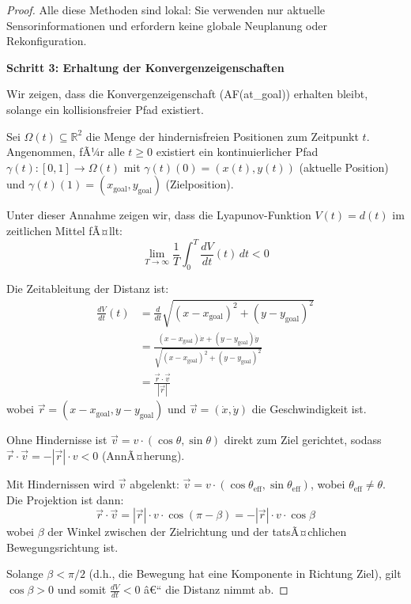 ﻿\documentclass[a4paper,12pt]{article}
\theoremstyle{definition}
\begin{document}
\begin{proof}
Alle diese Methoden sind lokal: Sie verwenden nur aktuelle Sensorinformationen und erfordern keine globale Neuplanung oder Rekonfiguration.

\textbf{Schritt 3: Erhaltung der Konvergenzeigenschaften}

Wir zeigen, dass die Konvergenzeigenschaft (AF(at\_goal)) erhalten bleibt, solange ein kollisionsfreier Pfad existiert.

Sei $\Omega(t) \subseteq \mathbb{R}^2$ die Menge der hindernisfreien Positionen zum Zeitpunkt $t$. Angenommen, fÃ¼r alle $t \geq 0$ existiert ein kontinuierlicher Pfad $\gamma(t): [0,1] \to \Omega(t)$ mit $\gamma(t)(0) = (x(t), y(t))$ (aktuelle Position) und $\gamma(t)(1) = (x_{\text{goal}}, y_{\text{goal}})$ (Zielposition).

Unter dieser Annahme zeigen wir, dass die Lyapunov-Funktion $V(t) = d(t)$ im zeitlichen Mittel fÃ¤llt:
\begin{equation}
\lim_{T \to \infty} \frac{1}{T} \int_0^T \frac{dV}{dt}(t) \, dt < 0
\end{equation}

Die Zeitableitung der Distanz ist:
\begin{align}
\frac{dV}{dt}(t) &= \frac{d}{dt} \sqrt{(x-x_{\text{goal}})^2 + (y-y_{\text{goal}})^2} \\
&= \frac{(x-x_{\text{goal}})\dot{x} + (y-y_{\text{goal}})\dot{y}}{\sqrt{(x-x_{\text{goal}})^2 + (y-y_{\text{goal}})^2}} \\
&= \frac{\vec{r} \cdot \vec{v}}{|\vec{r}|}
\end{align}
wobei $\vec{r} = (x-x_{\text{goal}}, y-y_{\text{goal}})$ und $\vec{v} = (\dot{x}, \dot{y})$ die Geschwindigkeit ist.

Ohne Hindernisse ist $\vec{v} = v \cdot (\cos\theta, \sin\theta)$ direkt zum Ziel gerichtet, sodass $\vec{r} \cdot \vec{v} = -|\vec{r}| \cdot v < 0$ (AnnÃ¤herung).

Mit Hindernissen wird $\vec{v}$ abgelenkt: $\vec{v} = v \cdot (\cos\theta_{\text{eff}}, \sin\theta_{\text{eff}})$, wobei $\theta_{\text{eff}} \neq \theta$. Die Projektion ist dann:
\begin{equation}
\vec{r} \cdot \vec{v} = |\vec{r}| \cdot v \cdot \cos(\pi - \beta) = -|\vec{r}| \cdot v \cdot \cos\beta
\end{equation}
wobei $\beta$ der Winkel zwischen der Zielrichtung und der tatsÃ¤chlichen Bewegungsrichtung ist.

Solange $\beta < \pi/2$ (d.h., die Bewegung hat eine Komponente in Richtung Ziel), gilt $\cos\beta > 0$ und somit $\frac{dV}{dt} < 0$ â€“ die Distanz nimmt ab.


\end{proof}
\end{document}
